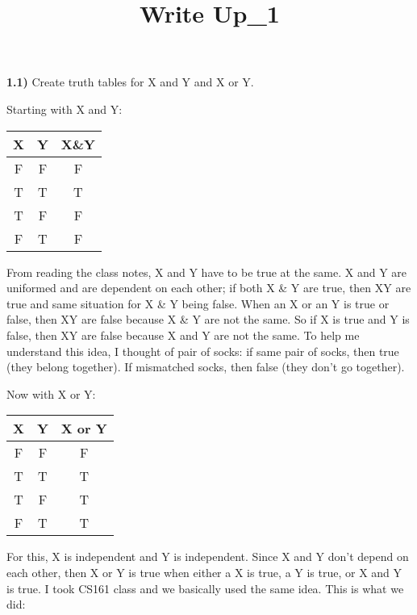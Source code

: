 \documentclass{article}
\title{Write Up\_1}
\date{}
\begin{document}
\maketitle

\textbf{1.1)} Create truth tables for X and Y and X or Y.

\vspace{3mm}

Starting with X and Y:


\begin{center}
\begin{tabular}{| c | c | c |}

X & Y & X\&Y \\
\hline
F & F & F \\
T & T & T \\
T & F & F \\
F & T & F
\end{tabular}
\end{center}

From reading the class notes,  X and Y have to be true at the same. X and Y are uniformed and are dependent on each other; if both X \& Y are true, then XY are true and same situation for X \& Y being false. When an X or  an Y is true or false, then XY are false because X \& Y are not the same. So if X is true and Y is false, then XY are false because X and Y are not the same. To help me understand this idea, I thought of pair of socks: if same pair of socks, then true (they belong together). If mismatched socks, then false (they don't go together).

\vspace{1in}

Now with X or Y:

\begin{center}
\begin{tabular}{| c | c | c |}
X & Y & X or Y \\
\hline
F & F & F \\
T & T & T \\
T & F & T \\
F & T & T
\end{tabular}
\end{center}

For this, X is independent and Y is independent. Since X and Y don't depend on each other, then X or Y is true when either a X is true, a Y is true, or X and Y is true. I took CS161 class and we basically used the same idea. This is what we did:
\end{document}
